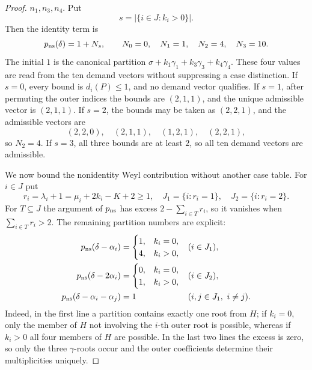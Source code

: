 \documentclass[11pt]{article}
\theoremstyle{definition}
\theoremstyle{remark}
\begin{document}
\begin{proof}
$n_1,n_3,n_4$.  Put
\[
 s=|\{i\in J:k_i>0\}|.
\]
Then the identity term is
\[
 p_{\rm ns}(\delta)=1+N_s,
 \qquad
 N_0=0,\quad N_1=1,\quad N_2=4,\quad N_3=10.
\]
The initial $1$ is the canonical partition
$\sigma+k_1\gamma_1+k_3\gamma_3+k_4\gamma_4$.  These four values are read
from the ten demand vectors without suppressing a case distinction.  If
$s=0$, every bound is $d_i(P)\le1$, and no demand vector qualifies.  If
$s=1$, after permuting the outer indices the bounds are $(2,1,1)$, and the
unique admissible vector is $(2,1,1)$.  If $s=2$, the bounds may be taken as
$(2,2,1)$, and the admissible vectors are
\[
 (2,2,0),\quad(2,1,1),\quad(1,2,1),\quad(2,2,1),
\]
so $N_2=4$.  If $s=3$, all three bounds are at least $2$, so all ten demand
vectors are admissible.

We now bound the nonidentity Weyl contribution without another case table.
For $i\in J$ put
\[
 r_i=\lambda_i+1=\mu_i+2k_i-K+2\ge1,
\quad
 J_1=\{i:r_i=1\},\quad J_2=\{i:r_i=2\}.
\]
For $T\subseteq J$ the argument of $p_{\rm ns}$ has excess
$2-\sum_{i\in T}r_i$, so it vanishes when
$\sum_{i\in T}r_i>2$.  The remaining partition numbers are explicit:
\begin{align*}
 p_{\rm ns}(\delta-\alpha_i)
   &=\begin{cases}1,&k_i=0,\\4,&k_i>0,\end{cases}
      &&(i\in J_1),\\
 p_{\rm ns}(\delta-2\alpha_i)
   &=\begin{cases}0,&k_i=0,\\1,&k_i>0,\end{cases}
      &&(i\in J_2),\\
 p_{\rm ns}(\delta-\alpha_i-\alpha_j)&=1
      &&(i,j\in J_1,\ i\ne j).
\end{align*}
Indeed, in the first line a partition contains exactly one root from $H$;
if $k_i=0$, only the member of $H$ not involving the $i$-th outer root is
possible, whereas if $k_i>0$ all four members of $H$ are possible.  In the
last two lines the excess is zero, so only the three $\gamma$-roots occur and
the outer coefficients determine their multiplicities uniquely.


\end{proof}
\end{document}
